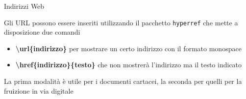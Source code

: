 \begin{frame}{Indirizzi Web}

Gli URL possono essere inseriti utilizzando il pacchetto \texttt{hyperref} che
mette a disposizione due comandi 
\begin{itemize}
	\item \textbf{\textbackslash{}url\{indirizzo\}} per mostrare un certo
	indirizzo con il formato monospace
	\item \textbf{\textbackslash{}href\{indirizzo\}\{testo\}} che non mostrerà
	l'indirizzo ma il testo indicato
\end{itemize}

\vfill

La prima modalità è utile per i documenti cartacei, la seconda per quelli per
la fruizione in via digitale

\end{frame}